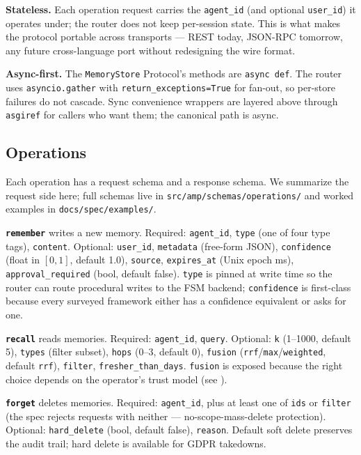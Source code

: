 \documentclass[11pt,letterpaper,twocolumn]{article}
\begin{document}
\textbf{Stateless.} Each operation request carries the \texttt{agent\_id} (and optional \texttt{user\_id}) it operates under; the router does not keep per-session state. This is what makes the protocol portable across transports --- REST today, JSON-RPC tomorrow, any future cross-language port without redesigning the wire format.

\textbf{Async-first.} The \texttt{MemoryStore} Protocol's methods are \texttt{async def}. The router uses \texttt{asyncio.gather} with \texttt{return\_exceptions=True} for fan-out, so per-store failures do not cascade. Sync convenience wrappers are layered above through \texttt{asgiref} for callers who want them; the canonical path is async.

\subsection{Operations}
\label{sec:spec-ops}

Each operation has a request schema and a response schema. We summarize the request side here; full schemas live in \texttt{src/amp/schemas/operations/} and worked examples in \texttt{docs/spec/examples/}.

\textbf{\texttt{remember}} writes a new memory. Required: \texttt{agent\_id}, \texttt{type} (one of four type tags), \texttt{content}. Optional: \texttt{user\_id}, \texttt{metadata} (free-form JSON), \texttt{confidence} (float in $[0,1]$, default 1.0), \texttt{source}, \texttt{expires\_at} (Unix epoch ms), \texttt{approval\_required} (bool, default false). \texttt{type} is pinned at write time so the router can route procedural writes to the FSM backend; \texttt{confidence} is first-class because every surveyed framework either has a confidence equivalent or asks for one.

\textbf{\texttt{recall}} reads memories. Required: \texttt{agent\_id}, \texttt{query}. Optional: \texttt{k} (1--1000, default 5), \texttt{types} (filter subset), \texttt{hops} (0--3, default 0), \texttt{fusion} (\texttt{rrf}/\texttt{max}/\texttt{weighted}, default \texttt{rrf}), \texttt{filter}, \texttt{fresher\_than\_days}. \texttt{fusion} is exposed because the right choice depends on the operator's trust model (see ).

\textbf{\texttt{forget}} deletes memories. Required: \texttt{agent\_id}, plus at least one of \texttt{ids} or \texttt{filter} (the spec rejects requests with neither --- no-scope-mass-delete protection). Optional: \texttt{hard\_delete} (bool, default false), \texttt{reason}. Default soft delete preserves the audit trail; hard delete is available for GDPR takedowns.
\end{document}
